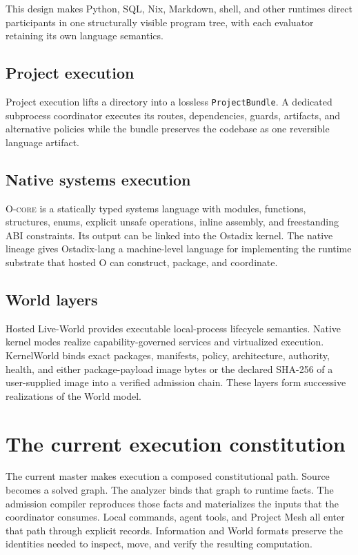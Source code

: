 \documentclass[11pt,oneside]{article}
\newcommand{\ocore}{\textsc{O-core}}
\begin{document}
This design makes Python, SQL, Nix, Markdown, shell, and other runtimes direct
participants in one structurally visible program tree, with each evaluator
retaining its own language semantics.

\subsection{Project execution}

Project execution lifts a directory into a lossless
\texttt{ProjectBundle}. A dedicated subprocess coordinator executes its
routes, dependencies, guards, artifacts, and alternative policies while the
bundle preserves the codebase as one reversible language artifact.

\subsection{Native systems execution}

\ocore{} is a statically typed systems language with modules,
functions, structures, enums, explicit unsafe operations, inline assembly,
and freestanding ABI constraints. Its output can be linked into the Ostadix
kernel. The native lineage gives Ostadix-lang a machine-level
language for implementing the runtime substrate that hosted O can construct,
package, and coordinate.

\subsection{World layers}

Hosted Live-World provides executable local-process lifecycle semantics.
Native kernel modes realize capability-governed services and virtualized
execution. KernelWorld binds exact packages, manifests, policy, architecture,
authority, health, and either package-payload image bytes or the declared
SHA-256 of a user-supplied image into a verified admission chain. These
layers form successive realizations of the World model.

\section{The current execution constitution}
\label{sec:constitution}

The current master makes execution a composed constitutional path. Source
becomes a solved graph. The analyzer binds that graph to runtime facts. The
admission compiler reproduces those facts and materializes the inputs that the
coordinator consumes. Local commands, agent tools, and Project Mesh all enter
that path through explicit records. Information and World formats preserve the
identities needed to inspect, move, and verify the resulting computation.
\end{document}
